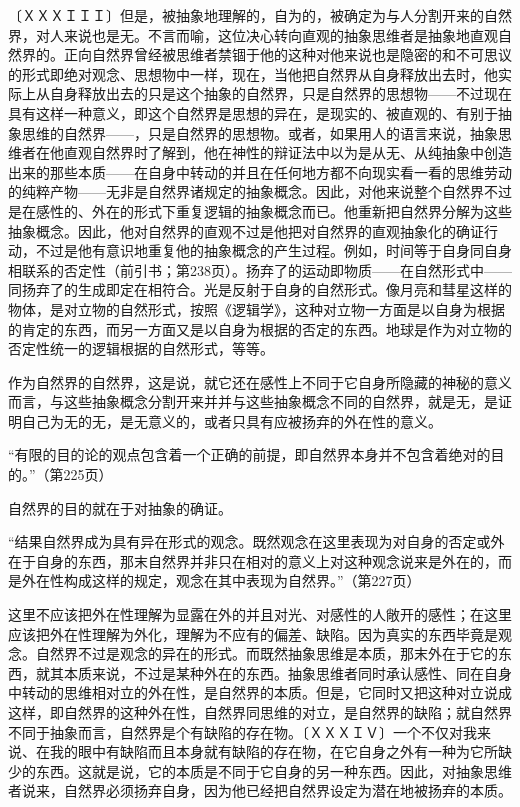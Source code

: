 \documentclass[a4paper,twoside,12pt,AutoFakeBold]{ctexart}
\begin{document}
〔ＸＸＸＩＩＩ〕但是，被抽象地理解的，自为的，被确定为与人分割开来的自然界，对人来说也是无。不言而喻，这位决心转向直观的抽象思维者是抽象地直观自然界的。正向自然界曾经被思维者禁锢于他的这种对他来说也是隐密的和不可思议的形式即绝对观念、思想物中一样，现在，当他把自然界从自身释放出去时，他实际上从自身释放出去的只是这个抽象的自然界，只是自然界的思想物——不过现在具有这样一种意义，即这个自然界是思想的异在，是现实的、被直观的、有别于抽象思维的自然界——，只是自然界的思想物。或者，如果用人的语言来说，抽象思维者在他直观自然界时了解到，他在神性的辩证法中以为是从无、从纯抽象中创造出来的那些本质——在自身中转动的并且在任何地方都不向现实看一看的思维劳动的纯粹产物——无非是自然界诸规定的抽象概念。因此，对他来说整个自然界不过是在感性的、外在的形式下重复逻辑的抽象概念而已。他重新把自然界分解为这些抽象概念。因此，他对自然界的直观不过是他把对自然界的直观抽象化的确证行动，不过是他有意识地重复他的抽象概念的产生过程。例如，时间等于自身同自身相联系的否定性（前引书；第238页）。扬弃了的运动即物质——在自然形式中——同扬弃了的生成即定在相符合。光是反射于自身的自然形式。像月亮和彗星这样的物体，是对立物的自然形式，按照《逻辑学》，这种对立物一方面是以自身为根据的肯定的东西，而另一方面又是以自身为根据的否定的东西。地球是作为对立物的否定性统一的逻辑根据的自然形式，等等。

作为自然界的自然界，这是说，就它还在感性上不同于它自身所隐藏的神秘的意义而言，与这些抽象概念分割开来并并与这些抽象概念不同的自然界，就是无，是证明自己为无的无，是无意义的，或者只具有应被扬弃的外在性的意义。

\begin{fangsong}
“有限的目的论的观点包含着一个正确的前提，即自然界本身并不包含着绝对的目的。”（第225页）
\end{fangsong}

自然界的目的就在于对抽象的确证。

\begin{fangsong}
“结果自然界成为具有异在形式的观念。既然观念在这里表现为对自身的否定或外在于自身的东西，那末自然界并非只在相对的意义上对这种观念说来是外在的，而是外在性构成这样的规定，观念在其中表现为自然界。”（第227页）
\end{fangsong}

这里不应该把外在性理解为显露在外的并且对光、对感性的人敞开的感性；在这里应该把外在性理解为外化，理解为不应有的偏差、缺陷。因为真实的东西毕竟是观念。自然界不过是观念的异在的形式。而既然抽象思维是本质，那末外在于它的东西，就其本质来说，不过是某种外在的东西。抽象思维者同时承认感性、同在自身中转动的思维相对立的外在性，是自然界的本质。但是，它同时又把这种对立说成这样，即自然界的这种外在性，自然界同思维的对立，是自然界的缺陷；就自然界不同于抽象而言，自然界是个有缺陷的存在物。〔ＸＸＸＩＶ〕一个不仅对我来说、在我的眼中有缺陷而且本身就有缺陷的存在物，在它自身之外有一种为它所缺少的东西。这就是说，它的本质是不同于它自身的另一种东西。因此，对抽象思维者说来，自然界必须扬弃自身，因为他已经把自然界设定为潜在地被扬弃的本质。
\end{document}
